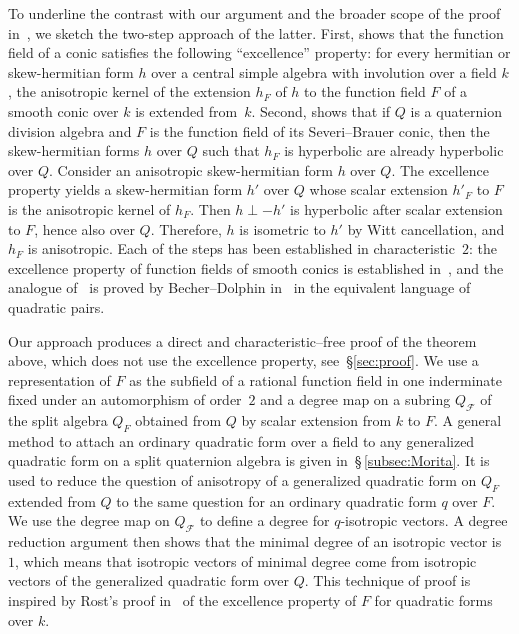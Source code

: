 \documentclass{amsart}
\newcommand{\calQ}{Q_\fq}
\newcommand{\FQ}{F}
\newcommand{\fq}{\mathcal{F}}
\theoremstyle{remark}
\begin{document}
To underline the contrast with our argument and the broader scope of the
proof in~\cite{PSS}, we sketch the two-step approach of the latter. First,
\cite[Cor.~2.2]{PSS} shows that the function field of a conic
satisfies the following ``excellence'' property: for every hermitian
or skew-hermitian form $h$ over a central simple algebra with
involution over a field $k$, the anisotropic kernel of the extension
$h_\FQ$ of $h$ to the function field $\FQ$ of a smooth conic over $k$
is extended from~$k$. Second, \cite[Prop.~3.3]{PSS} shows that if $Q$
is a quaternion division algebra and $\FQ$ is the function field of
its Severi--Brauer conic, then the
skew-hermitian forms $h$ over $Q$ such that $h_\FQ$ is hyperbolic are
already hyperbolic over $Q$. 
Consider an anisotropic skew-hermitian form $h$
over $Q$. 
The excellence property yields a
skew-hermitian form $h'$ over $Q$ whose scalar extension $h'_\FQ$ to
$\FQ$ is the anisotropic kernel of $h_\FQ$. Then $h\perp-h'$ is
hyperbolic after scalar extension to $\FQ$, hence also over
$Q$. Therefore, $h$ is isometric to $h'$ by Witt cancellation, and
$h_\FQ$ is anisotropic. Each of the steps has been 
established in characteristic~$2$: the excellence property of
function fields of smooth conics is established in~\cite{MT}, and 
the analogue of~\cite[Prop.~3.3]{PSS}
is proved by Becher--Dolphin in~\cite{BD} in 
the equivalent language of quadratic pairs.

Our approach produces a direct and characteristic--free proof of the theorem above, which does not use the excellence property, see~\S\ref{sec:proof}. 
We use a representation of $\FQ$ as the
subfield of a rational function field in one inderminate fixed under
an automorphism of order~$2$ and a degree map on a subring $\calQ$ of
the split algebra $Q_\FQ$ obtained from $Q$ by scalar extension from
$k$ to $\FQ$. A general method to attach an ordinary quadratic form
over a field to any generalized quadratic form on a split quaternion
algebra is given in~\S\,\ref{subsec:Morita}. It is used to reduce the
question of anisotropy of a generalized quadratic form on $Q_\FQ$
extended from $Q$ to the same question for an ordinary quadratic form
$q$ over $\FQ$. We use 
the degree map on $\calQ$ to define a degree for $q$-isotropic
vectors. A degree reduction argument then shows that the minimal
degree of an isotropic vector is~$1$, which means that isotropic
vectors of minimal degree come from isotropic vectors of the
generalized quadratic form over $Q$. This technique of proof is
inspired by Rost's  proof in~\cite{R} of the excellence property of
$\FQ$ for quadratic forms over $k$.
\end{document}
